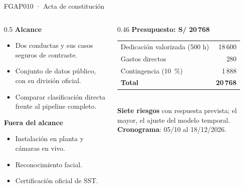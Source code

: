 \documentclass[aspectratio=169,11pt]{beamer}
\begin{document}
\begin{frame}{FGAP010 · Acta de constitución}
\begin{columns}[T]
\begin{column}{0.5\textwidth}\small
\textbf{\color{acento}Alcance}
\begin{itemize}
  \item Dos conductas y sus casos seguros de contraste.
  \item Conjunto de datos público, con su división oficial.
  \item Comparar clasificación directa frente al pipeline completo.
\end{itemize}
\vspace{4pt}
\textbf{\color{pendiente}Fuera del alcance}
\begin{itemize}
  \item Instalación en planta y cámaras en vivo.
  \item Reconocimiento facial.
  \item Certificación oficial de SST.
\end{itemize}
\end{column}
\begin{column}{0.46\textwidth}\small
\textbf{\color{acento}Presupuesto: S/ 20\,768}\\[4pt]
\begin{tabular}{@{}lr@{}}
Dedicación valorizada (500 h) & 18\,600\\
Gastos directos & 280\\
Contingencia (10~\%) & 1\,888\\
\midrule
\textbf{Total} & \textbf{20\,768}\\
\end{tabular}\\[10pt]
\textbf{\color{acento}Siete riesgos} con respuesta prevista; el mayor, el ajuste del modelo temporal.\\[4pt]
\textbf{\color{acento}Cronograma}: 05/10 al 18/12/2026.
\end{column}
\end{columns}
\end{frame}
\end{document}
